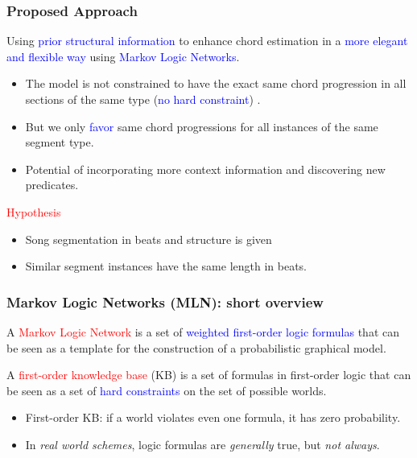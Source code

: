 \documentclass[12pt]{beamer}
\begin{document}
\begin{frame}
\frametitle{Proposed Approach}

Using \textcolor{blue}{prior structural information} to enhance chord estimation in a \textcolor{blue}{more elegant and flexible way} using \textcolor{blue}{Markov Logic Networks}.
\begin{itemize}
	\item The model is not constrained to have the exact same chord progression in all sections of the same type (\textcolor{blue}{no hard constraint}) .
	\item But we only \textcolor{blue}{favor} same chord progressions for all instances of the same segment type.
	\item Potential of  incorporating more context information and discovering new predicates.
\end{itemize}

\textcolor{red}{Hypothesis}
\begin{itemize}
	\item Song segmentation in beats and structure is given 
	\item Similar segment instances have the same length in beats.
\end{itemize}



\end{frame}


\begin{frame}
\frametitle{Markov Logic Networks (MLN): short overview}

A \textcolor{red}{Markov Logic Network} is a set of \textcolor{blue}{weighted first-order logic formulas} that can be seen as a template for the construction of a probabilistic graphical model.
\medskip

A \textcolor{red}{first-order knowledge base} (KB) is a set of formulas in first-order logic that can be seen as a set of \textcolor{blue}{hard constraints} on the set of possible worlds.

\begin{small}
\begin{itemize}
\item First-order KB: if a world violates even one formula, it has zero probability. 
\item In \textit{real world schemes}, logic formulas are \textit{generally} true, but \textit{not always}. 
\end{itemize}
\end{small}
\medskip
\end{frame}
\end{document}
